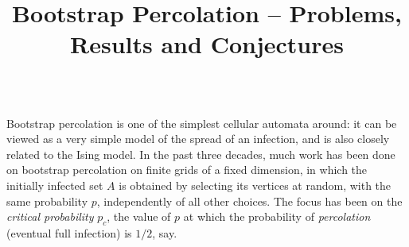 \documentclass{article}
\begin{document}
\begin{tabular}{ll}

\end{tabular}

\thispagestyle{empty}

\newpage


\Contents


\ContentsSpeakers

\newpage

%


\title{Bootstrap Percolation -- Problems, Results and Conjectures}
\endtitle

Bootstrap percolation is one of the simplest cellular automata around:
it can be viewed as a very simple model of the spread of an infection,
and is also closely related to the Ising model. In the past three decades,
much work has been done on bootstrap percolation on finite grids of a
fixed dimension, in which the initially infected set $A$ is obtained
by selecting its vertices at random, with the same probability $p$,
independently of all other choices. The focus has been on the {\em critical
probability} $p_c$, the value of $p$ at which the probability of {\em percolation}
(eventual full infection)  is $1/2$, say.
\end{document}
